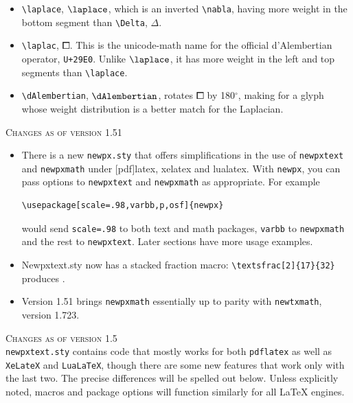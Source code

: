 \documentclass[11pt]{article}
\theoremstyle{oldplain}
\theoremstyle{plain}
\begin{document}
\begin{itemize}
\begin{itemize}
\item
\verb|\laplace|, $\laplace$, which is an inverted \verb|\nabla|, having more weight in the  bottom segment than \verb|\Delta|, $\Delta$.
\item
\verb|\laplac|, $\laplac$. This is the unicode-math name for the official d'Alembertian operator, {\tt U+29E0}. Unlike  $\laplace$, it has more weight in the left and top segments than \verb|\laplace|.
\item \verb|\dAlembertian|, $\dAlembertian$, rotates $\laplac$ by 180${}^\circ$, making for a glyph whose weight distribution is a better match for the Laplacian.
\end{itemize}
\end{itemize}
\textsc{Changes as of version 1.51}
\begin{itemize}
\item
There is a new {\tt newpx.sty} that  offers simplifications in the use of {\tt newpxtext} and {\tt newpxmath} under [pdf]latex, xelatex and lualatex. With {\tt newpx}, you can pass options to {\tt newpxtext} and {\tt newpxmath} as appropriate. For example
\begin{verbatim}
\usepackage[scale=.98,varbb,p,osf]{newpx}
\end{verbatim}
would send {\tt scale=.98} to both text and math packages, {\tt varbb} to {\tt newpxmath} and the rest to {\tt newpxtext}. Later sections have more usage examples. 
\item
{Newpxtext.sty} now has a stacked fraction macro:  \verb|\textsfrac[2]{17}{32}| produces . 
\item
Version 1.51 brings {\tt newpxmath} essentially up to parity with {\tt newtxmath}, version 1.723.
\end{itemize}
\textsc{Changes as of version 1.5}\\
 {\tt newpxtext.sty} contains code that mostly works for both {\tt pdflatex} as well as {\tt XeLateX} and {\tt LuaLaTeX}, though there are some new features that work only with the last two. The precise differences will be spelled out below. Unless explicitly noted, macros and package options will function similarly for all LaTeX engines.
\end{document}
